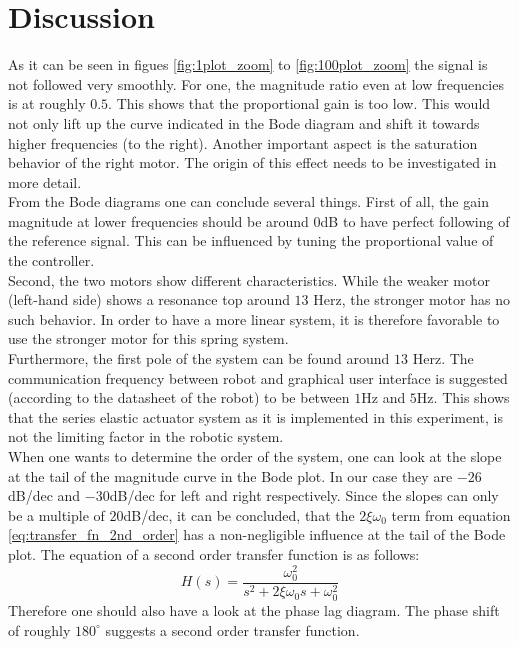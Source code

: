 	\section{Discussion}
	As it can be seen in figues \ref{fig:1plot_zoom} to \ref{fig:100plot_zoom} the signal is not followed very smoothly. For one, the magnitude ratio even at low frequencies is at roughly $0.5$. This shows that the proportional gain is too low. This would not only lift up the curve indicated in the Bode diagram and shift it towards higher frequencies (to the right). Another important aspect is the saturation behavior of the right motor. The origin of this effect  needs to be investigated in more detail.\\
	From the Bode diagrams one can conclude several things. First of all, the gain magnitude at lower frequencies should be around $0$dB to have perfect following of the reference signal. This can be influenced by tuning the proportional value of the controller.\\
	Second, the two motors show different characteristics. While the weaker motor (left-hand side) shows a resonance top around $13$ Herz, the stronger motor has no such behavior. In order to have a more linear system, it is therefore favorable to use the stronger motor for this spring system.\\
	Furthermore, the first pole of the system can be found around $13$ Herz. The communication frequency between robot and graphical user interface is suggested (according to the datasheet of the robot) to be between $1$Hz and $5$Hz. This shows that the series elastic actuator system as it is implemented in this experiment, is not the limiting factor in the robotic system.\\
	When one wants to determine the order of the system, one can look at the slope at the tail of the magnitude curve in the Bode plot. In our case they are $-26$dB/dec and $-30$dB/dec for left and right respectively. Since the slopes can only be a multiple of $20$dB/dec, it can be concluded, that the $2 \xi \omega _0$ term from equation \ref{eq:transfer_fn_2nd_order} has a non-negligible influence at the tail of the Bode plot.
	The equation of a second order transfer function is as follows:
	\begin{equation}
		H (s) = \frac{\omega _0^2}{s^2 + 2 \xi \omega _0 s + \omega _0^2}
		\label{eq:transfer_fn_2nd_order}
	\end{equation}
	Therefore one should also have a look at the phase lag diagram. The phase shift of roughly $180^\circ$ suggests a second order transfer function.
	
